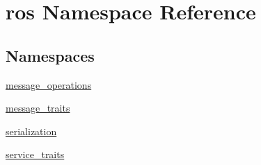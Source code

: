 \hypertarget{namespaceros}{\section{ros Namespace Reference}
\label{namespaceros}
}
\subsection*{Namespaces}
\begin{DoxyCompactItemize}
\item 
\hyperlink{namespaceros_1_1message__operations}{message\-\_\-operations}
\item 
\hyperlink{namespaceros_1_1message__traits}{message\-\_\-traits}
\item 
\hyperlink{namespaceros_1_1serialization}{serialization}
\item 
\hyperlink{namespaceros_1_1service__traits}{service\-\_\-traits}
\end{DoxyCompactItemize}
